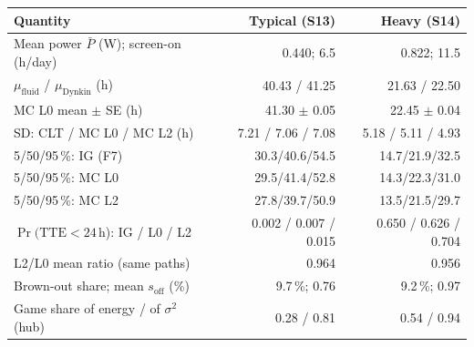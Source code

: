 \begin{tabular}{lrr}
\toprule
Quantity & Typical (S13) & Heavy (S14) \\
\midrule
Mean power $\bar P$ (W); screen-on (h/day) & 0.440; 6.5 & 0.822; 11.5 \\
$\mu_{\mathrm{fluid}}$ / $\mu_{\mathrm{Dynkin}}$ (h) & 40.43 / 41.25 & 21.63 / 22.50 \\
MC L0 mean $\pm$ SE (h) & 41.30 $\pm$ 0.05 & 22.45 $\pm$ 0.04 \\
SD: CLT / MC L0 / MC L2 (h) & 7.21 / 7.06 / 7.08 & 5.18 / 5.11 / 4.93 \\
5/50/95\,\%: IG (F7) & 30.3/40.6/54.5 & 14.7/21.9/32.5 \\
5/50/95\,\%: MC L0 & 29.5/41.4/52.8 & 14.3/22.3/31.0 \\
5/50/95\,\%: MC L2 & 27.8/39.7/50.9 & 13.5/21.5/29.7 \\
$\Pr(\mathrm{TTE}<24$\,h): IG / L0 / L2 & 0.002 / 0.007 / 0.015 & 0.650 / 0.626 / 0.704 \\
L2/L0 mean ratio (same paths) & 0.964 & 0.956 \\
Brown-out share; mean $s_{\mathrm{off}}$ (\%) & 9.7\,\%; 0.76 & 9.2\,\%; 0.97 \\
Game share of energy / of $\sigma^2$ (hub) & 0.28 / 0.81 & 0.54 / 0.94 \\
\bottomrule
\end{tabular}
